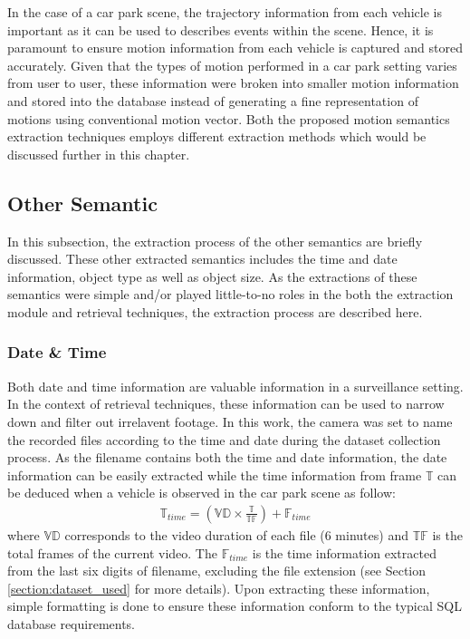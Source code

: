 In the case of a car park scene, the trajectory information from each vehicle is important as it can be used to describes events within the scene.
Hence, it is paramount to ensure motion information from each vehicle is captured and stored accurately.
Given that the types of motion performed in a car park setting varies from user to user, these information were broken into smaller motion information and stored into the database instead of generating a fine representation of motions using conventional motion vector. Both the proposed motion semantics extraction techniques employs different extraction methods which would be discussed further in this chapter.

\subsection{Other Semantic}

In this subsection, the extraction process of the other semantics are briefly discussed. These other extracted semantics includes the time and date information, object type as well as object size. As the extractions of these semantics were simple and/or played little-to-no roles in the both the extraction module and retrieval techniques, the extraction process are described here.

\subsubsection{Date \& Time}

Both date and time information are valuable information in a surveillance setting. In the context of retrieval techniques, these information can be used to narrow down and filter out irrelavent footage. In this work, the camera was set to name the recorded files according to the time and date during the dataset collection process. As the filename contains both the time and date information, the date information can be easily extracted while the time information from frame $\mathbb{T}$ can be deduced when a vehicle is observed in the car park scene as follow:
\begin{align}
    \mathbb{T}_{time}  = (\mathbb{VD} \times \frac{\mathbb{T}}{\mathbb{TF}}) + \mathbb{F}_{time}
\end{align}
where $\mathbb{VD}$ corresponds to the video duration of each file (6 minutes) and $\mathbb{TF}$ is the total frames of the current video. The $\mathbb{F}_{time}$ is the time information extracted from the last six digits of filename, excluding the file extension (see Section \ref{section:dataset_used} for more details). Upon extracting these information, simple formatting is done to ensure these information conform to the typical SQL database requirements.


